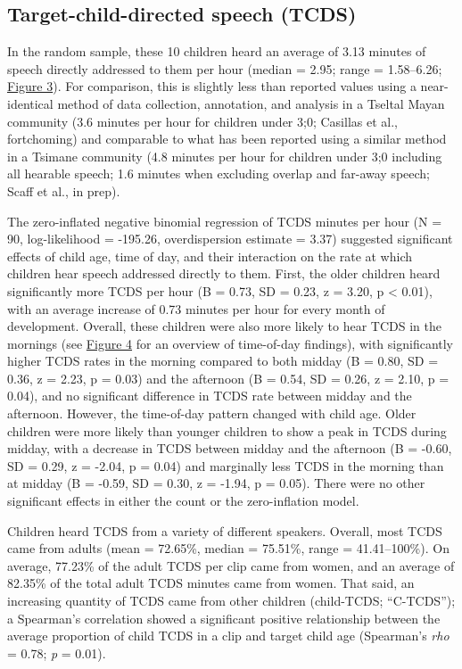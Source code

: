 \documentclass[,man,floatsintext]{apa6}
\begin{document}
\subsection{Target-child-directed speech
(TCDS)}\label{target-child-directed-speech-tcds}

In the random sample, these 10 children heard an average of 3.13 minutes
of speech directly addressed to them per hour (median = 2.95; range =
1.58--6.26; \protect\hyperlink{fig3}{Figure 3}). For comparison, this is
slightly less than reported values using a near-identical method of data
collection, annotation, and analysis in a Tseltal Mayan community (3.6
minutes per hour for children under 3;0; Casillas et al., fortchoming)
and comparable to what has been reported using a similar method in a
Tsimane community (4.8 minutes per hour for children under 3;0 including
all hearable speech; 1.6 minutes when excluding overlap and far-away
speech; Scaff et al., in prep).

The zero-inflated negative binomial regression of TCDS minutes per hour
(N = 90, log-likelihood = -195.26, overdispersion estimate = 3.37)
suggested significant effects of child age, time of day, and their
interaction on the rate at which children hear speech addressed directly
to them. First, the older children heard significantly more TCDS per
hour (B = 0.73, SD = 0.23, z = 3.20, p \textless{} 0.01), with an
average increase of 0.73 minutes per hour for every month of
development. Overall, these children were also more likely to hear TCDS
in the mornings (see \protect\hyperlink{fig4}{Figure 4} for an overview
of time-of-day findings), with significantly higher TCDS rates in the
morning compared to both midday (B = 0.80, SD = 0.36, z = 2.23, p =
0.03) and the afternoon (B = 0.54, SD = 0.26, z = 2.10, p = 0.04), and
no significant difference in TCDS rate between midday and the afternoon.
However, the time-of-day pattern changed with child age. Older children
were more likely than younger children to show a peak in TCDS during
midday, with a decrease in TCDS between midday and the afternoon (B =
-0.60, SD = 0.29, z = -2.04, p = 0.04) and marginally less TCDS in the
morning than at midday (B = -0.59, SD = 0.30, z = -1.94, p = 0.05).
There were no other significant effects in either the count or the
zero-inflation model.

Children heard TCDS from a variety of different speakers. Overall, most
TCDS came from adults (mean = 72.65\%, median = 75.51\%, range =
41.41--100\%). On average, 77.23\% of the adult TCDS per clip came from
women, and an average of 82.35\% of the total adult TCDS minutes came
from women. That said, an increasing quantity of TCDS came from other
children (child-TCDS; \enquote{C-TCDS}); a Spearman's correlation showed
a significant positive relationship between the average proportion of
child TCDS in a clip and target child age (Spearman's \emph{rho} = 0.78;
\emph{p} = 0.01).
\end{document}
